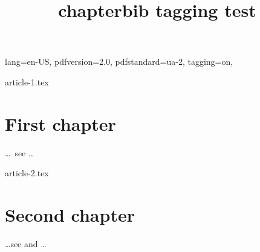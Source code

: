 \DocumentMetadata
  {
    lang=en-US,
    pdfversion=2.0,
    pdfstandard=ua-2,
    tagging=on,
  }
\begin{filecontents}[force]{article-1.tex}
\chapter{First chapter}
\ldots\ see \cite{inbook-full} \ldots


\end{filecontents}
\begin{filecontents}[force]{article-2.tex}
\chapter{Second chapter}
\ldots see \cite{inbook-full}
and \cite{article-full} \ldots


\end{filecontents}
\documentclass{report}

\usepackage[
  gather %
  ]{chapterbib}

\title{chapterbib tagging test}





